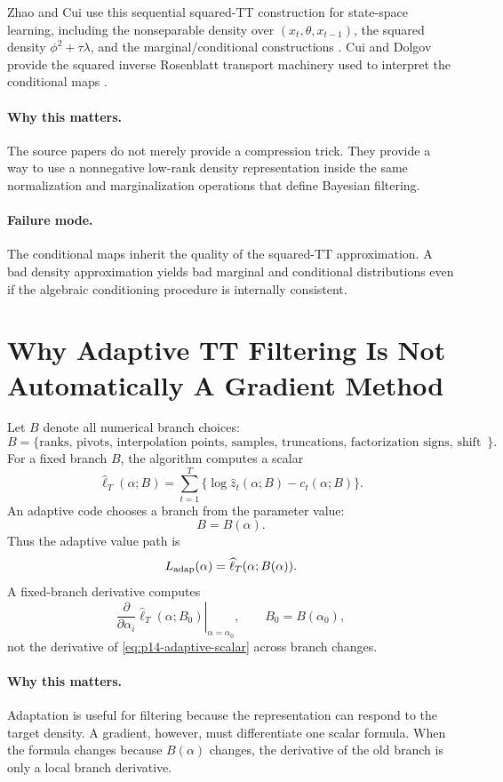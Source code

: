 \documentclass[11pt]{article}
\renewcommand{\[}{\begin{equation}}
\renewcommand{\]}{\end{equation}}
\theoremstyle{definition}
\theoremstyle{remark}
\begin{document}
Zhao and Cui use this sequential squared-TT construction for state-space
learning, including the nonseparable density over
\((x_t,\theta,x_{t-1})\), the squared density
\(\phi^2+\tau\lambda\), and the marginal/conditional constructions
\cite{zhao-cui-2024}.  Cui and Dolgov provide the squared inverse Rosenblatt
transport machinery used to interpret the conditional maps
\cite{cui-dolgov-2022}.

\paragraph{Why this matters.}
The source papers do not merely provide a compression trick.  They provide a
way to use a nonnegative low-rank density representation inside the same
normalization and marginalization operations that define Bayesian filtering.

\paragraph{Failure mode.}
The conditional maps inherit the quality of the squared-TT approximation.  A
bad density approximation yields bad marginal and conditional distributions
even if the algebraic conditioning procedure is internally consistent.

\section{Why Adaptive TT Filtering Is Not Automatically A Gradient Method}

Let \(B\) denote all numerical branch choices:
\[
  B=
  \{\text{ranks, pivots, interpolation points, samples, truncations,
  factorization signs, shift rule}\}.
  \label{eq:p14-branch}
\]
For a fixed branch \(B\), the algorithm computes a scalar
\[
  \widehat\ell_T(\alpha;B)
  =
  \sum_{t=1}^T
  \{\log\widehat z_t(\alpha;B)-c_t(\alpha;B)\}.
  \label{eq:p14-branch-scalar}
\]
An adaptive code chooses a branch from the parameter value:
\[
  B=B(\alpha).
  \label{eq:p14-adaptive-branch}
\]
Thus the adaptive value path is
\[
  L_{\rm adap}(\alpha)
  =
  \widehat\ell_T(\alpha;B(\alpha)).
  \label{eq:p14-adaptive-scalar}
\]
A fixed-branch derivative computes
\[
  \left.
  \frac{\partial}{\partial\alpha_i}
  \widehat\ell_T(\alpha;B_0)
  \right|_{\alpha=\alpha_0},
  \qquad B_0=B(\alpha_0),
  \label{eq:p14-fixed-branch-derivative}
\]
not the derivative of \eqref{eq:p14-adaptive-scalar} across branch changes.

\paragraph{Why this matters.}
Adaptation is useful for filtering because the representation can respond to
the target density.  A gradient, however, must differentiate one scalar formula.
When the formula changes because \(B(\alpha)\) changes, the derivative of the
old branch is only a local branch derivative.
\end{document}
